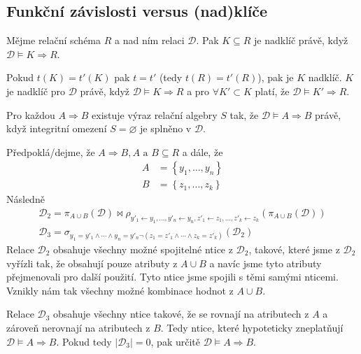 \subsection{Funkční závislosti versus (nad)klíče}
\begin{upquote}
Mějme relační schéma $R$ a nad ním relaci $\mathcal{D}$. Pak $K \subseteq R$ je nadklíč právě, když $\mathcal{D} \vDash K \Rightarrow R$.
\end{upquote}
\begin{upproof}
Pokud $t(K) = t'(K)$ pak $t = t'$ (tedy $t(R) = t'(R)$), pak je $K$ nadklíč.
$K$ je nadklíč pro $\mathcal{D}$ právě, když $\mathcal{D} \vDash K \Rightarrow R$ a pro $\forall K' \subset K$ platí, že $\mathcal{D} \vDash K' \Rightarrow R$.
\end{upproof}
\begin{upquote}
Pro každou $A \Rightarrow B$ existuje výraz relační algebry $S$ tak, že $\mathcal{D} \vDash A \Rightarrow B$ právě, když integritní omezení $S = \varnothing$ je splněno v $\mathcal{D}$.
\end{upquote}
\begin{upproof}
Předpoklá\-/dejme, že $A \Rightarrow B, A \text{ a } B \subseteq R$ a dále, že
\begin{align*}
A &= \left\{ y_{1}, \ldots, y_{n} \right\} \\
B &= \left\{ z_{1}, \ldots, z_{k} \right\}
\end{align*}
Následně
\begin{gather*}
\mathcal{D}_{2} = \pi_{A \cup B} (\mathcal{D}) \Join \rho_{y'_{1} \leftarrow y_{1}, \ldots, y'_{n} \leftarrow y_{n}, z'_{1} \leftarrow z_{1}, \ldots, z'_{k} \leftarrow z_{k}} \left(\pi_{A \cup B} (\mathcal{D})\right) \\
\mathcal{D}_{3} = \sigma_{y_{1} = y'_{1} \land \cdots \land y_{n} = y'_{n} \lnot(z_{1} = z'_{1} \land \cdots \land z_{k} = z'_{k})} \left( \mathcal{D}_{2} \right)
\end{gather*}
Relace $\mathcal{D}_{2}$ obsahuje všechny možné spojitelné ntice z $\mathcal{D}_{2}$, takové, které jsme z $\mathcal{D}_{2}$ vyřízli tak, že obsahují pouze atributy z $A \cup B$ a navíc jsme tyto atributy přejmenovali pro další použití. Tyto ntice jsme spojili s těmi samými nticemi. Vznikly nám tak všechny možné kombinace hodnot z $A \cup B$.

Relace $\mathcal{D}_{3}$ obsahuje všechny ntice takové, že se rovnají na atributech z $A$ a zároveň nerovnají na atributech z $B$. Tedy ntice, které hypoteticky zneplatňují $\mathcal{D} \vDash A \Rightarrow B$. Pokud tedy $|\mathcal{D}_{3}| = 0$, pak určitě $\mathcal{D} \vDash A \Rightarrow B$.

\end{upproof}
